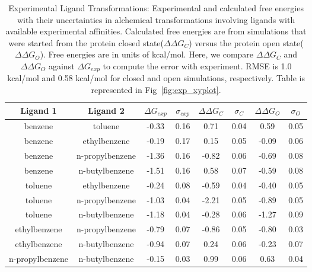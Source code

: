 \begin{table}[!htb]
\centering
\caption{Experimental Ligand Transformations:
Experimental and calculated free energies with their uncertainties in alchemical transformations involving ligands with available experimental affinities.
Calculated free energies are from simulations that were started from the protein closed state(\boldmath$\Delta\Delta G_{C}$) versus the protein open state(\boldmath$\Delta\Delta G_{O}$). 
 Free energies are in units of kcal/mol.
 Here, we compare \boldmath$\Delta\Delta G_{C}$ and \boldmath$\Delta\Delta G_{O}$ against \boldmath$\Delta G_{exp}$ to compute the error with experiment.
 RMSE is 1.0 kcal/mol and 0.58 kcal/mol for closed and open simulations, respectively.
 Table is represented in Fig~\ref{fig:exp_xyplot}.
}
\label{tbl:exp_set}
\begin{tabular}{|c|c|c|c|c|c|c|c|}
\hline
\textbf{Ligand 1} & \textbf{Ligand 2}  & \boldmath$\Delta G_{exp}$  & \boldmath$\sigma_{exp}$ & \boldmath$\Delta\Delta G_{C}$ & \boldmath$\sigma_{C}$ & \boldmath$\Delta\Delta G_{O}$ & \boldmath$\sigma_{O}$ \\ \hline
benzene         & toluene         & -0.33        & 0.16            & 0.71       & 0.04          & 0.59       & 0.05          \\ \hline
benzene         & ethylbenzene    & -0.19        & 0.17            & 0.15       & 0.05          & -0.09      & 0.06          \\ \hline
benzene         & n-propylbenzene & -1.36        & 0.16            & -0.82      & 0.06          & -0.69      & 0.08          \\ \hline
benzene         & n-butylbenzene  & -1.51        & 0.16            & 0.58       & 0.07          & -0.59      & 0.08          \\ \hline
toluene         & ethylbenzene    & -0.24        & 0.08            & -0.59      & 0.04          & -0.40      & 0.05          \\ \hline
toluene         & n-propylbenzene & -1.03        & 0.04            & -2.21      & 0.05          & -0.89      & 0.05          \\ \hline
toluene         & n-butylbenzene  & -1.18        & 0.04            & -0.28      & 0.06          & -1.27       & 0.09         \\ \hline
ethylbenzene    & n-propylbenzene & -0.79        & 0.07            & -0.86      & 0.05          & -0.80       & 0.03         \\ \hline
ethylbenzene    & n-butylbenzene  & -0.94        & 0.07            & 0.24       & 0.06          & -0.23      & 0.07          \\ \hline
n-propylbenzene & n-butylbenzene  & -0.15        & 0.03            & 0.99       & 0.06          & 0.63       & 0.04          \\ \hline
\end{tabular}
\end{table}

